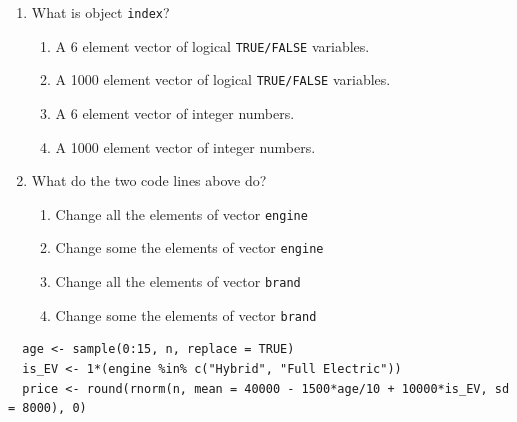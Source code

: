 \documentclass{article}
\begin{document}
\begin{enumerate}[resume]
  \item What is object \texttt{index}?
  \begin{enumerate}[label=\Alph*)]
    \item A 6 element vector of logical \texttt{TRUE/FALSE} variables.
    \item A 1000 element vector of logical \texttt{TRUE/FALSE} variables.
    \item A 6 element vector of integer numbers.
    \item A 1000 element vector of integer numbers.
  \end{enumerate}
  \item What do the two code lines above do?
  \begin{enumerate}[label=\Alph*)]
    \item Change all the elements of vector \texttt{engine}
    \item Change some the elements of vector \texttt{engine}
    \item Change all the elements of vector \texttt{brand}
    \item Change some the elements of vector \texttt{brand}
  \end{enumerate}
\end{enumerate}

\newpage

\begin{lstlisting}
  age <- sample(0:15, n, replace = TRUE) 
  is_EV <- 1*(engine %in% c("Hybrid", "Full Electric"))
  price <- round(rnorm(n, mean = 40000 - 1500*age/10 + 10000*is_EV, sd = 8000), 0)
\end{lstlisting}
\end{document}
